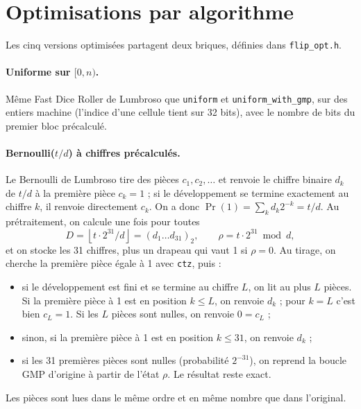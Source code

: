 \documentclass[11pt,a4paper]{article}
\newcommand{\code}[1]{\texttt{#1}}
\begin{document}
\section{Optimisations par algorithme}

Les cinq versions optimisées partagent deux briques, définies dans \code{flip\_opt.h}.

\paragraph{Uniforme sur $[0, n)$.} Même Fast Dice Roller de Lumbroso que
\code{uniform} et \code{uniform\_with\_gmp}, sur des entiers machine (l'indice d'une
cellule tient sur 32 bits), avec le nombre de bits du premier bloc précalculé.

\paragraph{Bernoulli($t/d$) à chiffres précalculés.} Le Bernoulli de Lumbroso tire des
pièces $c_1, c_2, \ldots$ et renvoie le chiffre binaire $d_k$ de $t/d$ à la première
pièce $c_k = 1$ ; si le développement se termine exactement au chiffre $k$, il renvoie
directement $c_k$. On a donc $\Pr(1) = \sum_k d_k 2^{-k} = t/d$. Au prétraitement, on
calcule une fois pour toutes
\[
D = \left\lfloor t\cdot 2^{31}/d \right\rfloor = (d_1\ldots d_{31})_2,
\qquad \rho = t\cdot 2^{31} \bmod d,
\]
et on stocke les 31 chiffres, plus un drapeau qui vaut 1 si $\rho = 0$. Au tirage, on
cherche la première pièce égale à 1 avec \code{ctz}, puis :
\begin{itemize}
\item si le développement est fini et se termine au chiffre $L$, on lit au plus $L$
  pièces. Si la première pièce à 1 est en position $k \le L$, on renvoie $d_k$ ; pour
  $k = L$ c'est bien $c_L = 1$. Si les $L$ pièces sont nulles, on renvoie $0 = c_L$ ;
\item sinon, si la première pièce à 1 est en position $k \le 31$, on renvoie $d_k$ ;
\item si les 31 premières pièces sont nulles (probabilité $2^{-31}$), on reprend la
  boucle GMP d'origine à partir de l'état $\rho$. Le résultat reste exact.
\end{itemize}
Les pièces sont lues dans le même ordre et en même nombre que dans l'original.
\end{document}
